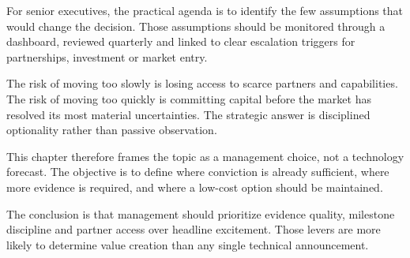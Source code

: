 \documentclass[10pt,a4paper]{article}
\begin{document}
{\small For senior executives, the practical agenda is to identify the few assumptions that would change the decision. Those assumptions should be monitored through a dashboard, reviewed quarterly and linked to clear escalation triggers for partnerships, investment or market entry.}\par
{\small The risk of moving too slowly is losing access to scarce partners and capabilities. The risk of moving too quickly is committing capital before the market has resolved its most material uncertainties. The strategic answer is disciplined optionality rather than passive observation.}\par
{\small This chapter therefore frames the topic as a management choice, not a technology forecast. The objective is to define where conviction is already sufficient, where more evidence is required, and where a low-cost option should be maintained.}\par
{\small The conclusion is that management should prioritize evidence quality, milestone discipline and partner access over headline excitement. Those levers are more likely to determine value creation than any single technical announcement.}\par
\label{chap:3:end}
\end{document}
